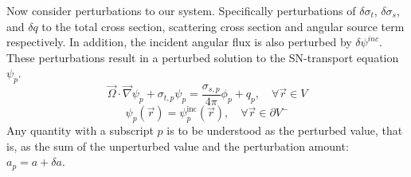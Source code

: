 \documentclass[12pt]{report}
\newcommand{\vr}{\vec{r}}
\newcommand{\vO}{\vec{\Omega}}
\newcommand{\grad}{\vec{\nabla}}
\newcommand{\sigt}{\sigma_t}
\newcommand{\sigs}{\sigma_s}
\begin{document}
Now consider perturbations to our system. Specifically perturbations of $\delta \sigt$, $\delta \sigs$, and $\delta q$ to the total cross section, scattering cross section and angular source term respectively. In addition, the incident angular flux is also perturbed by $\delta \psi^{inc}$. These perturbations result in a perturbed solution to the SN-transport equation $\psi_p$. 
\begin{equation}
\label{snFwdPert}
\vO \cdot \grad \psi_p + \sigma_{t,p} \psi_p = \frac{\sigma_{s,p}}{4 \pi} \phi_p + q_p,  \quad \forall \vr \in V
\end{equation}
\begin{equation}
\psi_p(\vr) = \psi_p^{\text{inc}}(\vr), \quad \forall \vr \in \partial V^{-}
\end{equation}
Any quantity with a subscript $p$ is to be understood as the perturbed value, that is, as 
the sum of the unperturbed value and the perturbation amount: $a_p = a + \delta a$.
\end{document}
